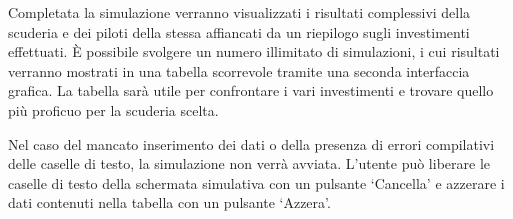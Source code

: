 Completata la simulazione verranno visualizzati i risultati complessivi della scuderia e dei piloti della stessa affiancati da un riepilogo sugli investimenti effettuati. È possibile svolgere un numero illimitato di simulazioni, i cui risultati verranno mostrati in una tabella scorrevole tramite una seconda interfaccia grafica. La tabella sarà utile per confrontare i vari investimenti e trovare quello più proficuo per la scuderia scelta.

Nel caso del mancato inserimento dei dati o della presenza di errori compilativi delle caselle di testo, la simulazione non verrà avviata.
L’utente può liberare le caselle di testo della schermata simulativa con un pulsante ‘Cancella’ e azzerare i dati contenuti nella tabella con un pulsante ‘Azzera’.

